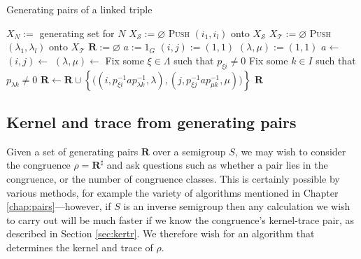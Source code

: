 \begin{algorithm}
\caption{Generating pairs of a linked triple}
\label{alg:linked-triple-to-pairs}
\begin{algorithmic}[1]
    \State $X_N := $ generating set for $N$
    \State $X_\mathcal{S} := \varnothing$
        \State \textsc{Push} $(i_1, i_l)$ onto $X_\mathcal{S}$
      \EndFor
    \EndFor
    \State $X_\mathcal{T} := \varnothing$
        \State \textsc{Push} $(\lambda_1, \lambda_l)$ onto $X_\mathcal{T}$
      \EndFor
    \EndFor
    \State $\mathbf{R} := \varnothing$
    \State $a := 1_G$
    \State $(i,j) := (1,1)$
    \State $(\lambda,\mu) := (1,1)$
        \State $a \gets$ 
      \EndIf
        \State $(i,j) \gets$ 
      \EndIf
        \State $(\lambda, \mu) \gets$ 
      \EndIf
      \State Fix some $\xi \in \Lambda$ such that $p_{\xi i} \neq 0$
      \State Fix some $k \in I$ such that $p_{\lambda k} \neq 0$
      \State $\mathbf{R} \gets \mathbf{R} \cup \left\{\big(
        (i, p_{\xi i}^{-1}ap_{\lambda k}^{-1}, \lambda),
        (j, p_{\xi j}^{-1}ap_{\mu k}^{-1}, \mu)
        \big)\right\}$
    \EndWhile
    \State \Return $\mathbf{R}$
  \EndProcedure
\end{algorithmic}
\end{algorithm}


\subsection{Kernel and trace from generating pairs}
\label{sec:pairs-to-kertr}

Given a set of generating pairs $\mathbf{R}$ over a semigroup $S$, we may wish
to consider the congruence $\rho = \mathbf{R}^\sharp$ and ask questions such as
whether a pair lies in the congruence, or the number of congruence classes.
This is certainly possible by various methods, for example the variety of
algorithms mentioned in Chapter \ref{chap:pairs}---however, if $S$ is an inverse
semigroup then any calculation we wish to carry out will be much faster if we
know the congruence's kernel-trace pair, as described in Section
\ref{sec:kertr}.  We therefore wish for an algorithm that determines the kernel
and trace of $\rho$.

